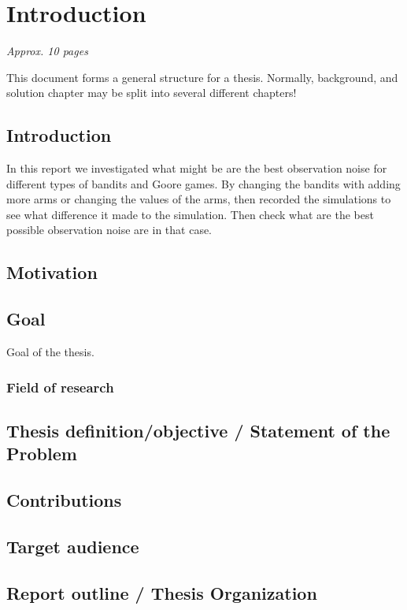 \chapter{Introduction}
\label{ch:introduction}

\textit{Approx. 10 pages}

This document forms a general structure for a thesis.
Normally, background, and solution chapter may be split into several different chapters!

\section{Introduction}
In this report we investigated what might be are the best observation noise for different 
types of bandits and Goore games. By changing the bandits with adding more arms or changing the values 
of the arms, then recorded the simulations to see what difference it made to the simulation. Then check 
what are the best possible observation noise are in that case.
\section{Motivation}

\section{Goal}
Goal of the thesis.

\subsection{Field of research}

\section{Thesis definition/objective / Statement of the Problem}

\section{Contributions}
 
\section{Target audience}


\section{Report outline / Thesis Organization}
